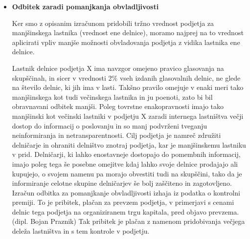 \documentclass[12pt,a4paper]{amsart}
\theoremstyle{definition} %
\theoremstyle{plain} %
\begin{document}
\begin{itemize}
\item{\textbf{Odbitek zaradi pomanjkanja obvladljivosti}}

Ker smo z opisanim izračunom pridobili tržno vrednost podjetja za manjšinskega lastnika (vrednost ene delnice), moramo najprej na to vrednost aplicirati vpliv manjše možnosti obvladovanja podjetja z vidika lastnika ene delnice.\par
Lastnik delnice podjetja X ima navzgor omejeno pravico glasovanja na skupščinah, in sicer v vrednosti 2\% vseh izdanih glasovalnih delnic, ne glede na število delnic, ki jih ima v lasti. Takšno pravilo omejuje v enaki meri tako manjšinskega kot tudi večinskega lastnika in ju poenoti, zato bi bil obravnavani odbitek manjši. Poleg tovrstne enakopravnosti imajo tako manjšinski kot večinski lastniki v podjetju X zaradi internega lastništva večji dostop do informacij o poslovanju in so manj podvrženi tveganju neinformiranja in netransparentnosti. Cilj podjetja je namreč združiti delničarje in ohraniti delništvo znotraj podjetja, kar je manjšinskemu lastniku v prid. Delničarji, ki lahko enostavneje dostopajo do pomembnih informacij, imajo poleg tega še posebne omejitve kdaj lahko svoje delnice prodajajo ali kupujejo, o svojem namenu pa morajo obvestiti tudi na skupščini, tako da je informiranje celotne skupine delničarjev še bolj zaščiteno in zagotovljeno. \\
Izračun odbitka za pomanjkanje obvladljivosti izhaja iz podatka o kontrolni premiji. To je pribitek, plačan za prevzem podjetja, v primerjavi s cenami delnic tega podjetja na organiziranem trgu kapitala, pred objavo prevzema. (dipl. Bojan Praznik) Tak pribitek je plačan z namenom pridobivanja večjega deleža lastništva in s tem kontrole v podjetju.\\

\end{itemize}
\end{document}
